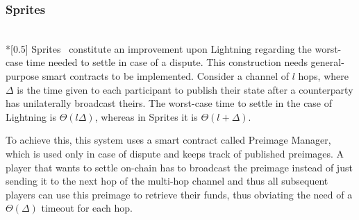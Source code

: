 \subsubsection{Sprites} \ \\*[0.5\baselineskip]
  Sprites~\cite{sprites} constitute an improvement upon Lightning regarding the worst-case
  time needed to settle in case of a dispute. This construction needs general-purpose
  smart contracts to be implemented. Consider a channel of $l$ hops, where $\Delta$ is the
  time given to each participant to publish their state after a counterparty has
  unilaterally broadcast theirs. The worst-case time to settle in the case of Lightning is
  $\Theta\left(l\Delta\right)$, whereas in Sprites it is $\Theta\left(l + \Delta\right)$.

  To achieve this, this system uses a smart contract called Preimage Manager, which is
  used only in case of dispute and keeps track of published preimages. A player that wants
  to settle on-chain has to broadcast the preimage instead of just sending it to the next
  hop of the multi-hop channel and thus all subsequent players can use this preimage to
  retrieve their funds, thus obviating the need of a $\Theta\left(\Delta\right)$ timeout
  for each hop.
